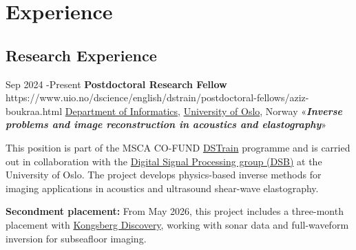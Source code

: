 \documentclass[10pt]{article} %
\begin{document}



	
	


\section{Experience}
\subsection{Research Experience}
\job
{Sep 2024 -}{Present}
{\textbf{Postdoctoral Research Fellow}}
{https://www.uio.no/dscience/english/dstrain/postdoctoral-fellows/aziz-boukraa.html}
{\href{https://www.mn.uio.no/ifi/english/}{Department of Informatics}, \href{https://www.uio.no/}{University of Oslo}, Norway}
{«\textbf{\textit{Inverse problems and image reconstruction in acoustics and elastography}}»}
{This position is part of the MSCA CO-FUND \href{https://www.uio.no/dscience/english/dstrain/postdoctoral-fellows/aziz-boukraa.html}{DSTrain} programme and is carried out in collaboration with the \href{https://www.mn.uio.no/ifi/english/research/groups/dsp/}{Digital Signal Processing group (DSB)} at the University of Oslo. The project develops physics-based inverse methods for imaging applications in acoustics and ultrasound shear-wave elastography.

\textbf{Secondment placement:} From May 2026, this project includes a three-month placement with \href{https://www.kongsberg.com/discovery/}{Kongsberg Discovery}, working with sonar data and full-waveform inversion for subseafloor imaging.
}
\end{document}
